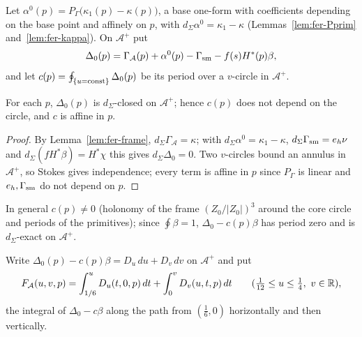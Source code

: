 \begin{definition}\label{def:fer-Delta}
Let $\alpha^0(p)=P_\Gamma\big(\kappa_1(p)-\kappa(p)\big)$, a base one-form with coefficients depending on the base point and
affinely on $p$, with $d_\Sigma\alpha^0=\kappa_1-\kappa$ (Lemmas~\ref{lem:fer-Pprim} and~\ref{lem:fer-kappa}). On $\mathcal A^+$ put
\[
 \Delta_0(p)=\Gamma_{\mathcal A}(p)+\alpha^0(p)-\Gamma_{\rm sm}-f(s)H^*(p)\beta ,
\]
and let $c(p)=\oint_{\{u={\rm const}\}}\Delta_0(p)$ be its period over a $v$-circle in $\mathcal A^+$.
\end{definition}

\begin{lemma}\label{lem:fer-Delta}
For each $p$, $\Delta_0(p)$ is $d_\Sigma$-closed on $\mathcal A^+$; hence $c(p)$ does not depend on the circle, and $c$ is affine
in $p$.
\end{lemma}

\begin{proof}
By Lemma~\ref{lem:fer-frame}, $d_\Sigma\Gamma_{\mathcal A}=\kappa$; with $d_\Sigma\alpha^0=\kappa_1-\kappa$, $d_\Sigma\Gamma_{\rm sm}=e_h\nu$ and $d_\Sigma(fH^*\beta)=H^*\chi$ this gives $d_\Sigma\Delta_0=0$. Two $v$-circles bound an annulus in $\mathcal A^+$, so Stokes gives independence; every term is affine in $p$ since $P_\Gamma$ is linear and $e_h,\Gamma_{\rm sm}$ do not depend on $p$.
\end{proof}

In general $c(p)\ne0$ (holonomy of the frame $(Z_0/|Z_0|)^3$ around the core circle and periods of the primitives); since $\oint\beta=1$, $\Delta_0-c(p)\beta$ has period zero and is $d_\Sigma$-exact on $\mathcal A^+$.

\begin{definition}\label{def:fer-FA}
Write $\Delta_0(p)-c(p)\beta=D_u\,du+D_v\,dv$ on $\mathcal A^+$ and put
\[
 F_{\mathcal A}(u,v,p)=\int_{1/6}^uD_u(t,0,p)\,dt+\int_0^vD_v(u,t,p)\,dt\qquad(\tfrac1{12}\le u\le\tfrac14,\ v\in\mathbb{R}),
\]
the integral of $\Delta_0-c\beta$ along the path from $(\frac16,0)$ horizontally and then vertically.
\end{definition}

